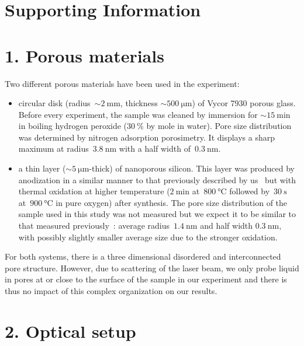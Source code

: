 \documentclass[aps,prl,twocolumn,superscriptaddress,groupedaddress]{revtex4}
\begin{document}
\newpage

\section{Supporting Information}

\section*{1. Porous materials}

Two different porous materials have been used in the experiment:
\begin{itemize}
\item circular disk (radius~$\sim \SI{2}{\milli\meter}$, thickness $\sim \SI{500}{\micro\meter}$) of Vycor 7930 porous glass. Before every experiment, the sample was cleaned by immersion for $\sim \SI{15}{\minute}$ in boiling hydrogen peroxide ($\SI{30}{\percent}$ by mole in water). Pore size distribution was determined by nitrogen adsorption porosimetry. It displays a sharp maximum at radius~$\SI{3.8}{\nano\meter}$ with a half width of~$\SI{0.3}{\nano\meter}$.
\item a thin layer ($\sim \SI{5}{\micro\meter}$-thick) of nanoporous silicon. This layer was produced by anodization in a similar manner to that previously described by us~\cite{vincent_2014} but with thermal oxidation at higher temperature ($\SI{2}{\minute}$ at~$\SI{800}{\celsius}$ followed by~$\SI{30}{\second}$ at~$\SI{900}{\celsius}$ in pure oxygen) after synthesis. The pore size distribution of the sample used in this study was not measured but we expect it to be similar to that measured previously~\cite{vincent_2014}: average radius~$\SI{1.4}{\nano\meter}$ and half width $\SI{0.3}{\nano\meter}$, with possibly slightly smaller average size due to the stronger oxidation.
\end{itemize} 

For both systems, there is a three dimensional disordered and interconnected pore structure. However, due to scattering of the laser beam, we only probe liquid in pores at or close to the surface of the sample in our experiment and there is thus no impact of this complex organization on our results.
 
\section*{2. Optical setup}
\end{document}
